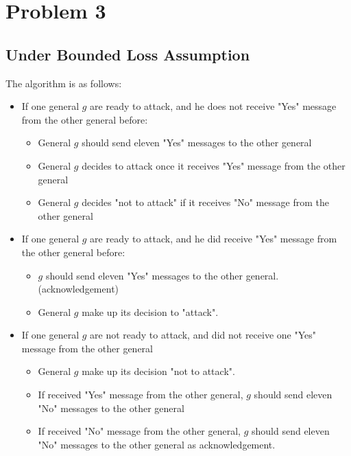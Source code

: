 \documentclass[11pt,a4paper]{article}
\begin{document}
\section{Problem 3}
\subsection{Under Bounded Loss Assumption}
The algorithm is as follows: 
\begin{itemize} 
    \item{If one general $g$ are ready to attack, and he does not receive "Yes"
        message from the other general before: }
        \begin{itemize}
            \item{General $g$ should send eleven "Yes" messages to the other general}
            \item{General $g$ decides to attack once it receives "Yes" message
                    from the other general}
            \item{General $g$ decides "not to attack" if it receives "No" message
                    from the other general}
        \end{itemize}
    \item{If one general $g$ are ready to attack, and he did receive "Yes"
        message from the other general before: }
        \begin{itemize}
            \item{$g$ should send eleven "Yes" messages to the other general.
                    (acknowledgement)}
            \item{General $g$ make up its decision to "attack".}
        \end{itemize}
    \item{If one general $g$ are not ready to attack, and did not receive one "Yes"
            message from the other general}
        \begin{itemize}
            \item{General $g$ make up its decision "not to attack".}
            \item{If received "Yes" message from the other general, $g$ should
                    send eleven "No" messages to the other general}
            \item{If received "No" message from the other general, $g$ should
                    send eleven "No" messages to the other general as
                    acknowledgement. }
        \end{itemize}
\end{itemize}
\end{document}

